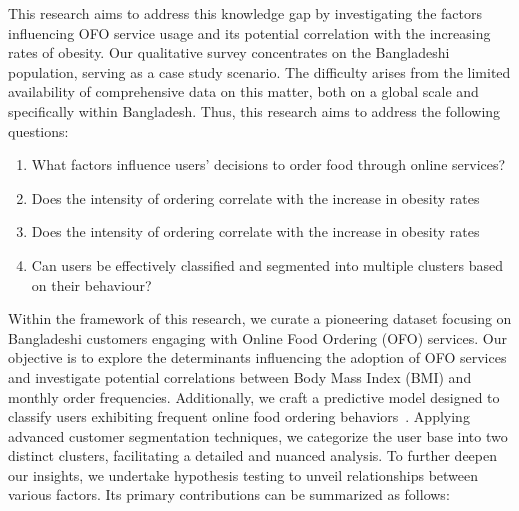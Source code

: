 \documentclass[a4paper,fleqn]{cas-sc}
\begin{document}
This research aims to address this knowledge gap by investigating the factors influencing OFO service usage and its potential correlation with the increasing rates of obesity. Our qualitative survey concentrates on the Bangladeshi population, serving as a case study scenario. The difficulty arises from the limited availability of comprehensive data on this matter, both on a global scale and specifically within Bangladesh. Thus, this research aims to address the following questions: 


\begin{enumerate}

    \item What factors influence users' decisions to order food through online services?
    
    \item Does the intensity of ordering correlate with the increase in obesity rates %

    \item Does the intensity of ordering correlate with the increase in obesity rates %

    \item Can users be effectively classified and segmented into multiple clusters based on their behaviour?
    

\end{enumerate}

Within the framework of this research, we curate a pioneering dataset focusing on Bangladeshi customers engaging with Online Food Ordering (OFO) services. Our objective is to explore the determinants influencing the adoption of OFO services and investigate potential correlations between Body Mass Index (BMI) and monthly order frequencies. Additionally, we craft a predictive model designed to classify users exhibiting frequent online food ordering behaviors~\cite{screti2024understanding}. Applying advanced customer segmentation techniques, we categorize the user base into two distinct clusters, facilitating a detailed and nuanced analysis. To further deepen our insights, we undertake hypothesis testing to unveil relationships between various factors. Its primary contributions can be summarized as follows:
\end{document}
